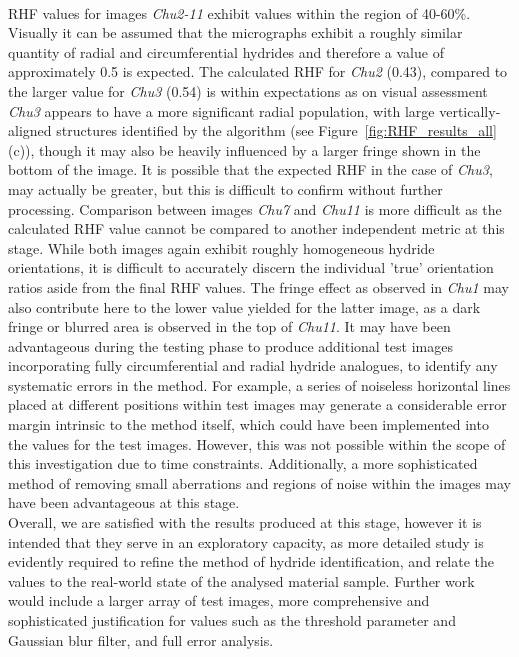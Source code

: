 \documentclass{article}
\begin{document}
    \\
    RHF values for images \textit{Chu2-11} exhibit values within the region of 40-60\%. Visually it can be assumed that the micrographs exhibit a roughly similar quantity of radial and circumferential hydrides and therefore a value of approximately 0.5 is expected. The calculated RHF for \textit{Chu2} (0.43), compared to the larger value for \textit{Chu3} (0.54) is within expectations as on visual assessment \textit{Chu3} appears to have a more significant radial population, with large vertically-aligned structures identified by the algorithm (see Figure~\ref{fig:RHF_results_all} (c)), though it may also be heavily influenced by a larger fringe shown in the bottom of the image. It is possible that the expected RHF in the case of \textit{Chu3}, may actually be greater, but this is difficult to confirm without further processing.
    Comparison between images \textit{Chu7} and \textit{Chu11} is more difficult as the calculated RHF value cannot be compared to another independent metric at this stage. While both images again exhibit roughly homogeneous hydride orientations, it is difficult to accurately discern the individual 'true' orientation ratios aside from the final RHF values. The fringe effect as observed in \textit{Chu1} may also contribute here to the lower value yielded for the latter image, as a dark fringe or blurred area is observed in the top of \textit{Chu11}.
    It may have been advantageous during the testing phase to produce additional test images incorporating fully circumferential and radial hydride analogues, to identify any systematic errors in the method. For example, a series of noiseless horizontal lines placed at different positions within test images may generate a considerable error margin intrinsic to the method itself, which could have been implemented into the values for the test images. However, this was not possible within the scope of this investigation due to time constraints. Additionally, a more sophisticated method of removing small aberrations and regions of noise within the images may have been advantageous at this stage.
    \\
    Overall, we are satisfied with the results produced at this stage, however it is intended that they serve in an exploratory capacity, as more detailed study is evidently required to refine the method of hydride identification, and relate the values to the real-world state of the analysed material sample. Further work would include a larger array of test images, more comprehensive and sophisticated justification for values such as the threshold parameter and Gaussian blur filter, and full error analysis.
    
\end{document}
